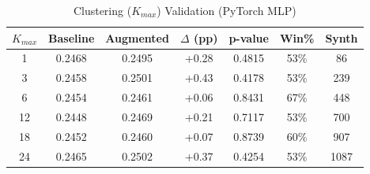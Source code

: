 \begin{table}[htbp]
\centering
\caption{Clustering ($K_{max}$) Validation (PyTorch MLP)}
\label{tab:pytorch_clustering}
\begin{tabular}{ccccccc}
\toprule
$K_{max}$ & Baseline & Augmented & $\Delta$ (pp) & p-value & Win\% & Synth \\
\midrule
1 & 0.2468 & 0.2495 & +0.28 & 0.4815 & 53\% & 86 \\
3 & 0.2458 & 0.2501 & +0.43 & 0.4178 & 53\% & 239 \\
6 & 0.2454 & 0.2461 & +0.06 & 0.8431 & 67\% & 448 \\
12 & 0.2448 & 0.2469 & +0.21 & 0.7117 & 53\% & 700 \\
18 & 0.2452 & 0.2460 & +0.07 & 0.8739 & 60\% & 907 \\
24 & 0.2465 & 0.2502 & +0.37 & 0.4254 & 53\% & 1087 \\
\bottomrule
\end{tabular}
\end{table}